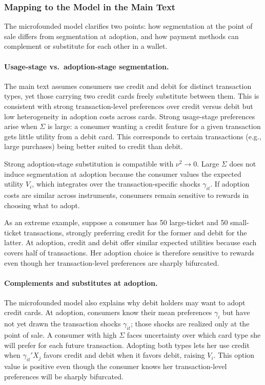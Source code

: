 \documentclass[main.tex]{subfiles}
\begin{document}
\subsubsection{Mapping to the Model in the Main Text}

The microfounded model clarifies two points: how segmentation at the point of sale differs from segmentation at adoption, and how payment methods can complement or substitute for each other in a wallet.


\paragraph{Usage-stage vs.\ adoption-stage segmentation.} The main text assumes consumers use credit and debit for distinct transaction types, yet those carrying two credit cards freely substitute between them.
This is consistent with strong transaction-level preferences over credit versus debit but low heterogeneity in adoption costs across cards.
Strong usage-stage preferences arise when $\Sigma$ is large: a consumer wanting a credit feature for a given transaction gets little utility from a debit card.
This corresponds to certain transactions (e.g., large purchases) being better suited to credit than debit.

Strong adoption-stage substitution is compatible with $\nu^2 \to 0$.
Large $\Sigma$ does not induce segmentation at adoption because the consumer values the expected utility $V_i$, which integrates over the transaction-specific shocks $\gamma_{it}$.
If adoption costs are similar across instruments, consumers remain sensitive to rewards in choosing what to adopt.

As an extreme example, suppose a consumer has 50 large-ticket and 50 small-ticket transactions, strongly preferring credit for the former and debit for the latter.
At adoption, credit and debit offer similar expected utilities because each covers half of transactions.
Her adoption choice is therefore sensitive to rewards even though her transaction-level preferences are sharply bifurcated.

\paragraph{Complements and substitutes at adoption.} The microfounded model also explains why debit holders may want to adopt credit cards.
At adoption, consumers know their mean preferences $\gamma_i$ but have not yet drawn the transaction shocks $\gamma_{it}$; those shocks are realized only at the point of sale.
A consumer with high $\Sigma$ faces uncertainty over which card type she will prefer for each future transaction.
Adopting both types lets her use credit when $\gamma_{it}' X_j$ favors credit and debit when it favors debit, raising $V_i$.
This option value is positive even though the consumer knows her transaction-level preferences will be sharply bifurcated.
\end{document}
